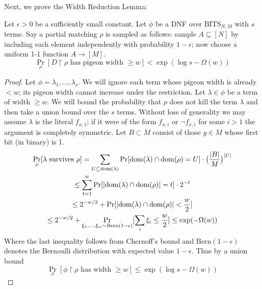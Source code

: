Next, we prove the Width Reduction Lemma:

\begin{lemma}\label{lem:width-red}
Let $\epsilon > 0$ be a sufficiently small constant. Let $\phi$ be a DNF over $\mathrm{BITS}_{N,M}$ with $s$ terms. Say a partial matching $\rho$ is sampled as follows: sample $A \subseteq [N]$ by including each element independently with probability $1-\epsilon$; now choose a uniform 1-1 function $A \to [M]$.
\[
\Pr_{\rho}[D\upharpoonright \rho \text{ has pigeon width } \geq w] < \exp(\log s - \Omega(w))
\]
\end{lemma}
\begin{proof}
Let $\phi = \lambda_1,\ldots,\lambda_s$. We will ignore each term whose pigeon width is already $<w$; its pigeon width cannot increase under the restriction. Let $\lambda \in \phi$ be a term of width $\geq w$. We will bound the probability that $\rho$ does not kill the term $\lambda$ and then take a union bound over the $s$ terms. Without loss of generality we may assume $\lambda$ is the literal $f_{x,1}$; if it were of the form $f_{x,i}$ or $\lnot f_{x,i}$ for some $i > 1$ the argument is completely symmetric. Let $B \subset M$ consist of those $y\in M$ whose first bit (in binary) is 1. 
\begin{gather*}
\Pr_{\rho}[\lambda \text{ survives }\rho] = \sum\limits_{U \subseteq \mathrm{dom}(\lambda)} \Pr[\mathrm{dom}(\lambda) \cap \mathrm{dom}(\rho) = U] \cdot \bigl(\frac{|B|}{M}\bigr)^{|U|} \\
\leq \sum_{t=1}^w\Pr[|\mathrm{dom}(\lambda) \cap \mathrm{dom}(\rho)| = t] \cdot 2^{-t}\\
\leq 2^{-w/2}+\Pr[|\mathrm{dom}(\lambda) \cap \mathrm{dom}(\rho)| < \frac{w}{2}] \\
\leq 2^{-w/2} + \Pr_{\xi_1,\ldots,\xi_w \sim \mathrm{Bern}(1-\epsilon)} [\sum_i \xi_i \leq \frac{w}{2}] \leq \exp(- \Omega(w))
\end{gather*}
Where the last inequality follows from Chernoff's bound and $\mathrm{Bern}(1-\epsilon)$ denotes the Bernoulli distribution with expected value $1-\epsilon$. Thus by a union bound 
\[
\Pr_{\rho}[\phi\upharpoonright \rho \text{ has width } \geq w] \leq \exp(\log s - \Omega(w))
\]
\end{proof}


